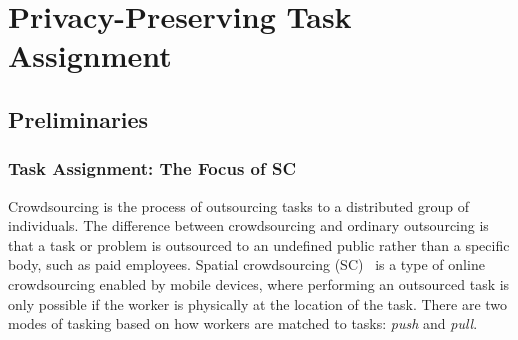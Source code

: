 \documentclass{USC-Thesis}
\numberwithin{equation}{chapter}
\begin{document}
%
%


\chapter{Privacy-Preserving Task Assignment}\label{ch.PPTA}

\section{Preliminaries}
\subsection{Task Assignment: The Focus of SC}

Crowdsourcing is the process of outsourcing tasks to a distributed group of individuals. The difference
between crowdsourcing and ordinary outsourcing is that a task or problem is outsourced to an undefined
public rather than a specific body, such as paid employees.
Spatial crowdsourcing (SC)~\cite{kazemi2012geocrowd} is a type of online crowdsourcing enabled by mobile devices, where performing an outsourced task is only possible if the worker is physically at the location of the task. There are two modes of tasking based on how workers are matched to tasks: \emph{push} and \emph{pull}.
\end{document}

